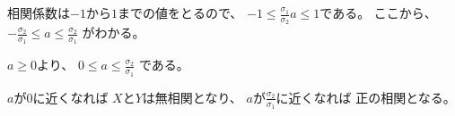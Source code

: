 \documentclass[12pt,b5paper]{ltjsarticle}
\begin{document}
\begin{enumerate}
\begin{enumerate}
            相関係数は$-1$から$1$までの値をとるので、
            $-1\leq \frac{\sigma_{1}}{\sigma_{2}}a \leq 1$である。
            ここから、
            $-\frac{\sigma_{2}}{\sigma_{1}} \leq a \leq \frac{\sigma_{2}}{\sigma_{1}}$
            がわかる。

            $a\geq0$より、
            $0\leq a \leq \frac{\sigma_{2}}{\sigma_{1}}$
            である。

            $a$が$0$に近くなれば
            $X$と$Y$は無相関となり、
            $a$が$\frac{\sigma_{2}}{\sigma_{1}}$に近くなれば
            正の相関となる。

            \hrulefill

      \end{enumerate}

\end{enumerate}

\hrulefill
\end{document}
